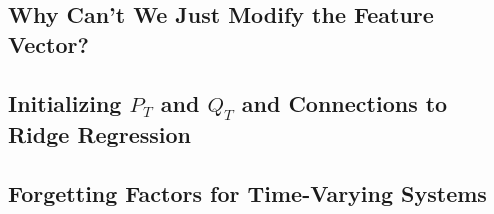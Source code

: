 \subsection{Why Can't We Just Modify the Feature Vector?}

\subsection{Initializing $P_T$ and $Q_T$ and Connections to Ridge Regression}

\subsection{Forgetting Factors for Time-Varying Systems}
